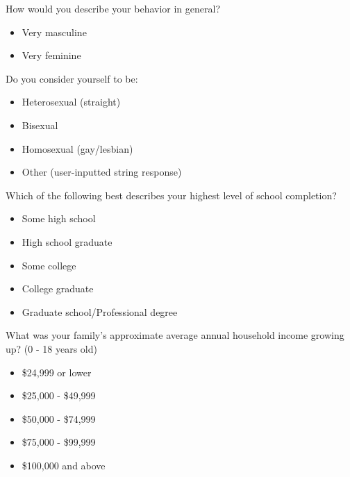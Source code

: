 \begin{multicols}{2}
 How would you describe your behavior in general?

 \begin{itemize}
  \item
        Very masculine
 \end{itemize}

 \begin{itemize}
  \item
        Very feminine
 \end{itemize}

 Do you consider yourself to be:

 \begin{itemize}
  \item
        Heterosexual (straight)
 \end{itemize}

 \begin{itemize}
  \item
        Bisexual
  \item
        Homosexual (gay/lesbian)
  \item
        Other (user-inputted string response)
 \end{itemize}

 Which of the following best describes your highest level of school completion?

 \begin{itemize}
  \item
        Some high school
 \end{itemize}

 \begin{itemize}
  \item
        High school graduate
  \item
        Some college
  \item
        College graduate
  \item
        Graduate school/Professional degree
 \end{itemize}

 What was your family's approximate average annual household income growing up? (0 - 18 years old)

 \begin{itemize}
  \item
        \$24,999 or lower
 \end{itemize}

 \begin{itemize}
  \item
        \$25,000 - \$49,999
  \item
        \$50,000 - \$74,999
  \item
        \$75,000 - \$99,999
  \item
        \$100,000 and above
 \end{itemize}


\end{multicols}
